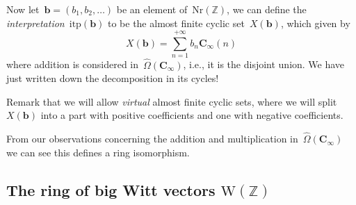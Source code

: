 Now let~$\mathbf{b}=(b_1,b_2,\ldots)$ be an element of~$\mathrm{Nr}(\mathbb{Z})$, we can define the \emph{interpretation}~$\mathrm{itp}(\mathbf{b})$ to be the almost finite cyclic set~$X(\mathbf{b})$, which given by
\begin{equation}
  X(\mathbf{b})=\sum_{n=1}^{+\infty}b_n\mathbf{C}_\infty(n)
\end{equation}
where addition is considered in~$\hat{\Omega}(\mathbf{C}_\infty)$, i.e., it is the disjoint union. We have just written down the decomposition in its cycles!

Remark that we will allow \emph{virtual} almost finite cyclic sets, where we will split~$X(\mathbf{b})$ into a part with positive coefficients and one with negative coefficients.

From our observations concerning the addition and multiplication in~$\hat{\Omega}(\mathbf{C}_\infty)$ we can see this defines a ring isomorphism.


\subsection{The ring of big Witt vectors $\mathrm{W}(\mathbb{Z})$}
